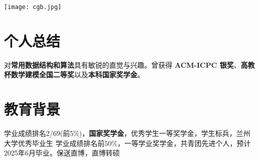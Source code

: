\documentclass{resume}
\begin{document}





\begin{minipage}[t]{0.78\textwidth} %
	\centering
	\vspace{0.5em} %
\end{minipage}%
\begin{minipage}[t]{0.15\textwidth}
	\vspace{-2.4em} %
	\begin{flushright}
		\texttt{[image: cgb.jpg]} %
	\end{flushright}
\end{minipage}
\begin{minipage}[t]{0.07\textwidth}
\end{minipage}





\section{个人总结}
对\textbf{常用数据结构和算法}具有敏锐的直觉与兴趣。曾获得\textbf{ ACM-ICPC 银奖}、\textbf{高教杯数学建模全国二等奖}以及\textbf{本科国家奖学金}。

\section{教育背景}

学业成绩排名2/69(前5\%)，\textbf{国家奖学金}，优秀学生一等奖学金，学生标兵，兰州大学优秀毕业生
学业成绩排名前50\%，一等学业奖学金，共青团先进个人，预计2025年6月毕业。保送直博，直博转硕
\end{document}
